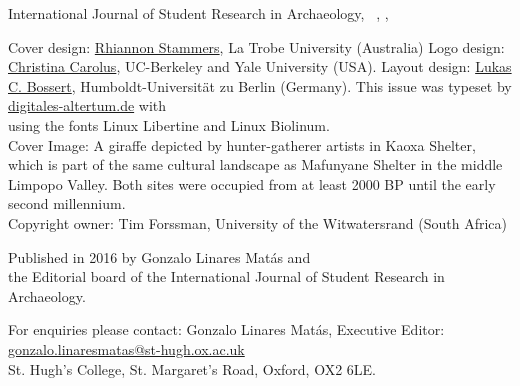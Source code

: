 
\IJSRAtitlepage
\thispagestyle{empty}
\hfill
\vfill

\begin{footnotesize}
\noindent International Journal of Student Research in Archaeology,\newline
\IJSRAmonth\ \IJSRAyear , \IJSRAvolume , \IJSRAnumber\\
\vspace{2em}


\noindent Cover design: \href{https://latrobe.academia.edu/RhiannonStammers}{Rhiannon Stammers}, La Trobe University (Australia)\newline
\noindent Logo design: \href{https://hraf.yale.edu/about/staff/christina-carolus/}{Christina Carolus}, UC-Berkeley and Yale University (USA).\newline
\noindent Layout design: \href{https://hu-berlinhttps://dainst.academia.edu/LukasCBossert}{Lukas C. Bossert}, Humboldt-Universität zu Berlin (Germany). \newline \indent This issue was typeset by \href{www.digitales-altertum.de}{digitales-altertum.de}  with  \\ \indent using the fonts Linux Libertine and {\sffamily Linux Biolinum}.\\
Cover Image: 
A giraffe depicted by hunter-gatherer artists in Kaoxa Shelter, which is part of the same cultural landscape as Mafunyane Shelter in the middle Limpopo Valley. Both sites were occupied from at least 2000 BP until the early second millennium\AD.\\
Copyright owner: Tim Forssman, University of the Witwatersrand (South Africa)

\vspace{2em}

\noindent Published in 2016 by Gonzalo Linares Matás and \\ the Editorial board of the International Journal of Student Research in Archaeology. 




\vspace{2em}






\noindent For enquiries please contact: Gonzalo Linares Matás, Executive Editor:\\ \href{mailto:gonzalo.linaresmatas@st-hugh.ox.ac.uk}{gonzalo.linaresmatas@st-hugh.ox.ac.uk}\\  St. Hugh’s College, St. Margaret’s Road, Oxford, OX2 6LE.


\end{footnotesize}
